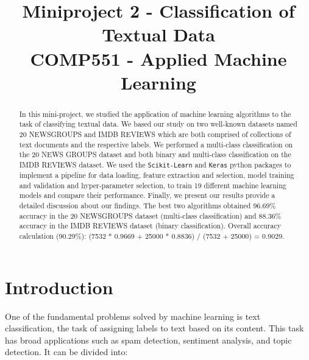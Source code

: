 \documentclass[conference]{IEEEtran}
\begin{document}
\title{Miniproject 2 - Classification of Textual Data \\
{\small COMP551 - Applied Machine Learning}
}

\author{
\and
{}
\and
{}
}

\maketitle

\begin{abstract}
   In this mini-project, we studied the application of machine learning algorithms to the task of classifying textual data. We based our study on two well-known datasets named 20 NEWSGROUPS and IMDB REVIEWS which are both comprised of collections of text documents and the respective labels. We performed a multi-class classification on the 20 NEWS GROUPS dataset and both binary and multi-class classification on the IMDB REVIEWS dataset. We used the \texttt{Scikit-Learn} and \texttt{Keras} python packages to implement a pipeline for data loading, feature extraction and selection, model training and validation and hyper-parameter selection, to train 19 different machine learning models and compare their performance. Finally, we present our results provide a detailed discussion about our findings. The best two algorithms obtained 96.69\% accuracy in the 20 NEWSGROUPS dataset (multi-class classification) and 88.36\% accuracy in the IMDB REVIEWS dataset (binary classification). Overall accuracy calculation (90.29\%): (7532 * 0.9669 + 25000 * 0.8836) / (7532 + 25000) = 0.9029.
\end{abstract}


\section{Introduction}
\label{section:introduction}

One of the fundamental problems solved by machine learning is text classification, the task of assigning labels to text based on its content. This task has broad applications such as spam detection, sentiment analysis, and topic detection. It can be divided into:
\end{document}
